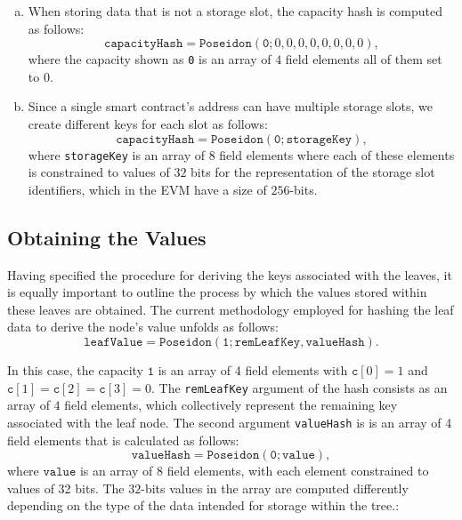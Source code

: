 \begin{enumerate}[(a)]

\item When storing data that is not a storage slot, the capacity hash is computed as follows:
\[
\texttt{capacityHash}  = \texttt{Poseidon}(\texttt{0}; 0, 0, 0, 0, 0, 0, 0, 0),
\]
where the capacity shown as \texttt{0} is an array of $4$ field elements all of them set to $0$.

\item Since a single smart contract's address can have multiple storage slots, we create different keys for each slot as follows:
\[
\texttt{capacityHash} = \texttt{Poseidon}(\texttt{0}; \texttt{storageKey}),
\]
where \texttt{storageKey} is an array of $8$ field elements where each of these elements is constrained to values of $32$ bits for the representation of the storage slot identifiers, which in the EVM have a size of $256$-bits.

\end{enumerate}


\subsection{Obtaining the Values}

Having specified the procedure for deriving the keys associated with the leaves, it is equally important to outline the process by which the values stored within these leaves are obtained. The current methodology employed for hashing the leaf data to derive the node's value unfolds as follows:
\[
\texttt{leafValue} = \texttt{Poseidon}(\texttt{1}; \texttt{remLeafKey}, \texttt{valueHash}).
\]

In this case, the capacity $\texttt{1}$ is an array of 4 field elements with $\texttt{c}[0] = 1$ and $\texttt{c}[1] = \texttt{c}[2] = \texttt{c}[3] = 0$. The \texttt{remLeafKey} argument of the hash consists as an array of $4$ field elements, which collectively represent the remaining key associated with the leaf node. The second argument \texttt{valueHash} is is an array of 4 field elements that is calculated as follows:
\[
\texttt{valueHash} = \texttt{Poseidon}(\texttt{0}; \texttt{value}),
\]
where $\texttt{value}$ is an array of 8 field elements, with each element constrained to values of 32 bits. The $32$-bits values in the array are computed differently depending on the type of the data intended for storage within the tree.:

